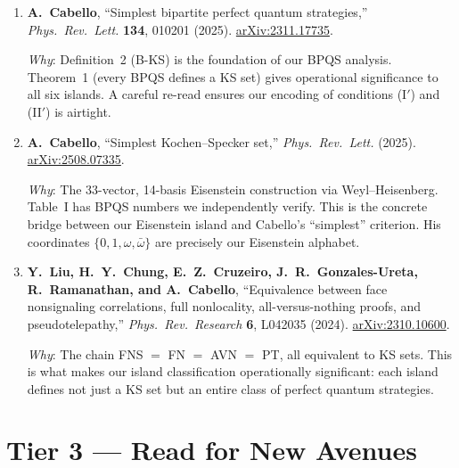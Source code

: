 \documentclass[11pt,a4paper]{article}
\begin{document}
\begin{enumerate}[label=\textbf{\arabic*.}, leftmargin=2em, start=5]

\item \textbf{A.~Cabello},
``Simplest bipartite perfect quantum strategies,''
\textit{Phys.\ Rev.\ Lett.} \textbf{134}, 010201 (2025).
\href{https://arxiv.org/abs/2311.17735}{arXiv:2311.17735}.

\smallskip\noindent
\textit{Why}: Definition~2 (B-KS) is the foundation of our BPQS analysis.  Theorem~1 (every BPQS defines a KS set) gives operational significance to all six islands.  A careful re-read ensures our encoding of conditions (I$'$) and (II$'$) is airtight.

\bigskip

\item \textbf{A.~Cabello},
``Simplest Kochen--Specker set,''
\textit{Phys.\ Rev.\ Lett.} (2025).
\href{https://arxiv.org/abs/2508.07335}{arXiv:2508.07335}.

\smallskip\noindent
\textit{Why}: The 33-vector, 14-basis Eisenstein construction via Weyl--Heisenberg.  Table~I has BPQS numbers we independently verify.  This is the concrete bridge between our Eisenstein island and Cabello's ``simplest'' criterion.  His coordinates $\{0, 1, \omega, \bar\omega\}$ are precisely our Eisenstein alphabet.

\bigskip

\item \textbf{Y.~Liu, H.~Y.~Chung, E.~Z.~Cruzeiro, J.~R.~Gonzales-Ureta, R.~Ramanathan, and A.~Cabello},
``Equivalence between face nonsignaling correlations, full nonlocality, all-versus-nothing proofs, and pseudotelepathy,''
\textit{Phys.\ Rev.\ Research} \textbf{6}, L042035 (2024).
\href{https://arxiv.org/abs/2310.10600}{arXiv:2310.10600}.

\smallskip\noindent
\textit{Why}: The chain FNS $=$ FN $=$ AVN $=$ PT, all equivalent to KS sets.  This is what makes our island classification operationally significant: each island defines not just a KS set but an entire class of perfect quantum strategies.

\end{enumerate}

\bigskip

\section*{\textcolor{tier3}{Tier 3 --- Read for New Avenues}}
\end{document}
